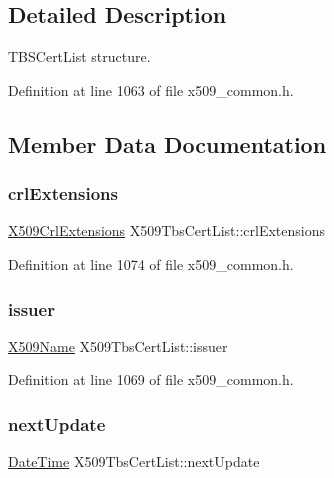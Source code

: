 \subsection{Detailed Description}
T\+B\+S\+Cert\+List structure. 

Definition at line 1063 of file x509\+\_\+common.\+h.



\subsection{Member Data Documentation}
\mbox{\label{structX509TbsCertList_a084e1f8c74fb44d6a347df943a0dc728}} 
\subsubsection{\texorpdfstring{crl\+Extensions}{crlExtensions}}
{\footnotesize\ttfamily \hyperlink{structX509CrlExtensions}{X509\+Crl\+Extensions} X509\+Tbs\+Cert\+List\+::crl\+Extensions}



Definition at line 1074 of file x509\+\_\+common.\+h.

\mbox{\label{structX509TbsCertList_adbb517b77f6ccf54375d3453ca3966c1}} 
\subsubsection{\texorpdfstring{issuer}{issuer}}
{\footnotesize\ttfamily \hyperlink{structX509Name}{X509\+Name} X509\+Tbs\+Cert\+List\+::issuer}



Definition at line 1069 of file x509\+\_\+common.\+h.

\mbox{\label{structX509TbsCertList_aa3573e4d72e2170ad201f25be63c0276}} 
\subsubsection{\texorpdfstring{next\+Update}{nextUpdate}}
{\footnotesize\ttfamily \hyperlink{structDateTime}{Date\+Time} X509\+Tbs\+Cert\+List\+::next\+Update}



